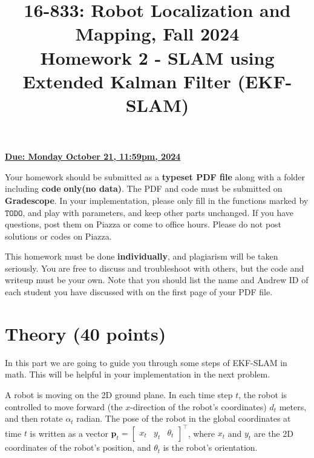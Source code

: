\documentclass[12pt, a4paper]{article}
\date{}
\begin{document}
\title{\Large 16-833: Robot Localization and Mapping, Fall 2024\\
	\textbf{Homework 2 - SLAM using Extended Kalman Filter (EKF-SLAM)}}
\maketitle
\begin{flushright}
	\textbf{\uline{Due: Monday October 21, 11:59pm, 2024}}
	\par\end{flushright}


Your homework should be submitted as a\textbf{ typeset PDF file} along
with a\textbf{ }folder\textbf{ }including\textbf{ code} \textbf{only(no data)}.
The PDF and code must be submitted on \textbf{Gradescope}.
In your implementation, please only fill in the functions marked by $\mathtt{TODO}$,
and play with parameters, and keep other parts unchanged.
If you have questions, post them on Piazza or come to office hours.
Please do not post solutions or codes on Piazza.

This homework must be done \textbf{individually}, and plagiarism will
be taken seriously. You are free to discuss and troubleshoot with
others, but the code and writeup must be your own. Note that you should
list the name and Andrew ID of each student you have discussed with
on the first page of your PDF file.

\section{Theory (40 points)}

In this part we are going to guide you through some steps of EKF-SLAM
in math. This will be helpful in your implementation in the next problem.

A robot is moving on the 2D ground plane. In each time step $t$,
the robot is controlled to move forward (the $x$-direction of the
robot's coordinates) $d_{t}$ meters, and then rotate $\alpha_{t}$
radian. The pose of the robot in the global coordinates at time $t$
is written as a vector $\mathbf{p}_{t}=\left[\begin{array}{ccc}
			x_{t} & y_{t} & \theta_{t}\end{array}\right]^{\top}$, where $x_{t}$ and $y_{t}$ are the 2D coordinates of the robot's
position, and $\theta_{t}$ is the robot's orientation.
\end{document}
